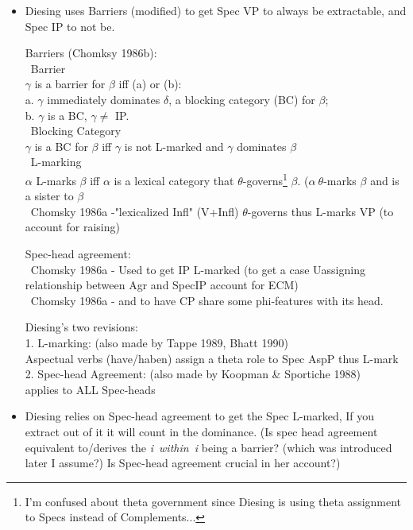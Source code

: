 \documentclass[landscape]{article}
\begin{document}
\begin{itemize}
\item Diesing uses Barriers (modified) to get Spec VP to always be extractable, and Spec IP to not be.
\begin{example}Barriers (Chomksy 1986b):\\
~Barrier \\
$\gamma$ is a barrier for $\beta$ iff (a) or (b):\\
a. $\gamma$ immediately dominates $\delta$, a blocking category (BC) for $\beta$;\\
b. $\gamma$ is a BC, $\gamma \neq$ IP.\\
~Blocking Category\\
$\gamma$ is a BC for $\beta$ iff $\gamma$ is not L-marked and $\gamma$ dominates $\beta$\\
~L-marking\\
$\alpha$ L-marks $\beta$ iff $\alpha$ is a lexical category that $\theta$-governs\footnote{ I'm confused about theta government since Diesing is using theta assignment to Specs instead of Complements...} $\beta$. ($\alpha~\theta$-marks $\beta$ and is a sister to $\beta$\\
~Chomsky 1986a -"lexicalized Infl" (V+Infl) $\theta$-governs thus L-marks VP (to account for raising)
\end{example}
\begin{example}Spec-head agreement:\\
~Chomsky 1986a - Used to get IP L-marked (to get a case Uassigning relationship between Agr and SpecIP account for ECM) \\
~Chomsky 1986a - and to have CP share some phi-features with its head.
 \end{example}

\begin{example}Diesing's two revisions: \\
1. L-marking: (also made by Tappe 1989, Bhatt 1990)\\ 
Aspectual verbs (have/haben) assign a theta role  to Spec AspP thus L-mark \\
2. Spec-head Agreement: (also made by Koopman \& Sportiche 1988)\\
 applies to ALL Spec-heads 
\end{example}

\item Diesing relies on Spec-head agreement to get the Spec L-marked, If you extract out of it it will count in  the dominance. (Is spec head agreement equivalent to/derives the \textit{i~within~i} being a barrier?  (which was introduced later I assume?) Is Spec-head agreement  crucial in her account?)


\end{itemize}
\end{document}
